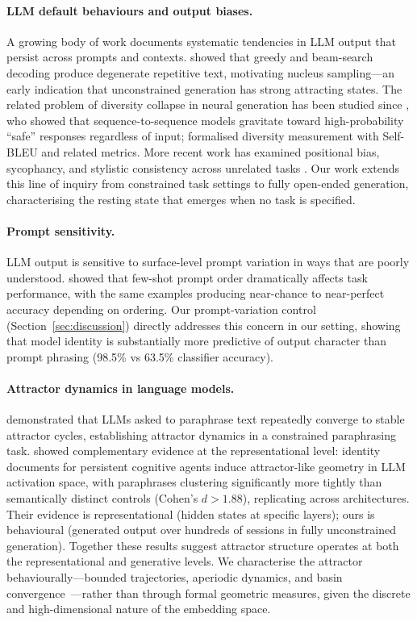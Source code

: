 \documentclass{article}
\begin{document}
\paragraph{LLM default behaviours and output biases.}
A growing body of work documents systematic tendencies in LLM output that
persist across prompts and contexts. \citet{holtzman2020curious} showed that
greedy and beam-search decoding produce degenerate repetitive text, motivating
nucleus sampling---an early indication that unconstrained generation has strong
attracting states. The related problem of diversity collapse in neural generation
has been studied since \citet{li2016diversity}, who showed that sequence-to-sequence
models gravitate toward high-probability ``safe'' responses regardless of input;
\citet{zhu2018texygen} formalised diversity measurement with Self-BLEU and related
metrics. More recent work has examined positional bias, sycophancy, and stylistic
consistency across unrelated tasks \citep{sharma2023sycophancy, wang2024positionbias}.
Our work extends this line of inquiry from constrained task settings to fully
open-ended generation, characterising the resting state that emerges when no
task is specified.

\paragraph{Prompt sensitivity.}
LLM output is sensitive to surface-level prompt variation in ways that are poorly
understood. \citet{lu2022prompts} showed that few-shot prompt order dramatically
affects task performance, with the same examples producing near-chance to
near-perfect accuracy depending on ordering. Our prompt-variation control
(Section~\ref{sec:discussion}) directly addresses this concern in our setting,
showing that model identity is substantially more predictive of output character
than prompt phrasing (98.5\% vs 63.5\% classifier accuracy).

\paragraph{Attractor dynamics in language models.}
\citet{wang2025attractor} demonstrated that LLMs asked to paraphrase text
repeatedly converge to stable attractor cycles, establishing attractor dynamics
in a constrained paraphrasing task. \citet{identity2026attractor} showed
complementary evidence at the representational level: identity documents for
persistent cognitive agents induce attractor-like geometry in LLM activation
space, with paraphrases clustering significantly more tightly than semantically
distinct controls (Cohen's $d > 1.88$), replicating across architectures. Their
evidence is representational (hidden states at specific layers); ours is
behavioural (generated output over hundreds of sessions in fully unconstrained
generation). Together these results suggest attractor structure operates at both
the representational and generative levels. We characterise the attractor
behaviourally---bounded trajectories, aperiodic dynamics, and basin
convergence~\citep{strogatz1994nonlinear}---rather than through formal geometric
measures, given the discrete and high-dimensional nature of the embedding space.
\end{document}
